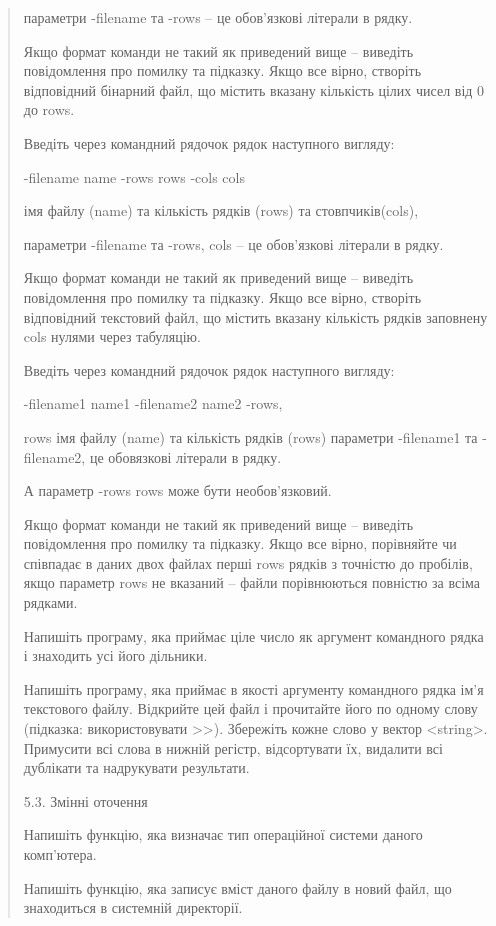 \documentclass[]{article}
\begin{document}
\begin{quote}
параметри -filename та -rows -- це обов'язкові літерали в рядку.

Якщо формат команди не такий як приведений вище -- виведіть повідомлення
про помилку та підказку. Якщо все вірно, створіть відповідний бінарний
файл, що містить вказану кількість цілих чисел від 0 до rows.

Введіть через командний рядочок рядок наступного вигляду:

-filename name -rows rows -cols cols

імя файлу (name) та кількість рядків (rows) та стовпчиків(cols),

параметри -filename та -rows, cols -- це обов'язкові літерали в рядку.

Якщо формат команди не такий як приведений вище -- виведіть повідомлення
про помилку та підказку. Якщо все вірно, створіть відповідний текстовий
файл, що містить вказану кількість рядків заповнену cols нулями через
табуляцію.

Введіть через командний рядочок рядок наступного вигляду:

-filename1 name1 -filename2 name2 -rows,

rows імя файлу (name) та кількість рядків (rows) параметри -filename1 та
-filename2, це обовязкові літерали в рядку.

А параметр -rows rows може бути необов'язковий.

Якщо формат команди не такий як приведений вище -- виведіть повідомлення
про помилку та підказку. Якщо все вірно, порівняйте чи співпадає в даних
двох файлах перші rows рядків з точністю до пробілів, якщо параметр rows
не вказаний -- файли порівнюються повністю за всіма рядками.

Напишіть програму, яка приймає ціле число як аргумент командного рядка і
знаходить усі його дільники.

Напишіть програму, яка приймає в якості аргументу командного рядка ім'я
текстового файлу. Відкрийте цей файл і прочитайте його по одному слову
(підказка: використовувати \textgreater{}\textgreater{}). Збережіть
кожне слово у вектор \textless{}string\textgreater{}. Примусити всі
слова в нижній регістр, відсортувати їх, видалити всі дублікати та
надрукувати результати.

5.3. Змінні оточення

Напишіть функцію, яка визначає тип операційної системи даного
комп'ютера.

Напишіть функцію, яка записує вміст даного файлу в новий файл, що
знаходиться в системній директорії.


\end{quote}
\end{document}
